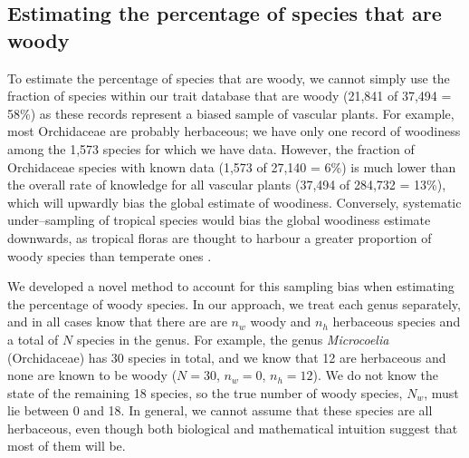 \documentclass[a4paper,12pt]{article}
\begin{document}
\subsection{Estimating the percentage of species that are woody}

To estimate the percentage of species that are woody, we cannot simply
use the fraction of species within our trait database that are woody
(21,841 of 37,494 = 58\%) as these records represent a biased sample
of vascular plants.
For example, most Orchidaceae are probably herbaceous; we have only
one record of woodiness among the 1,573 species for which we have
data.
However, the fraction of Orchidaceae species with known data (1,573 of
27,140 = 6\%)
is much lower than the overall rate of knowledge for all vascular
plants (37,494 of 284,732 = 13\%), which will upwardly bias the global
estimate of woodiness.
Conversely, systematic under--sampling of tropical species would bias
the global woodiness estimate downwards, as tropical floras are thought to harbour
a greater proportion of woody species than temperate ones \citep{Molesheihgt}.


We developed a novel method to account for this sampling bias when
estimating the percentage of woody species.  In our approach, we treat
each genus separately, and in all cases know that there are are $n_w$
woody and $n_h$ herbaceous species and a total of $N$ species in the genus.
%
For example, the genus \textit{Microcoelia} (Orchidaceae) has 30
species in total, and we know that 12 are herbaceous and none are
known to be woody ($N = 30$, $n_w = 0$, $n_h = 12$). We do not know
the state of the remaining 18 species, so the true number of woody
species, $N_w$, must lie between 0 and 18. In general, we cannot
assume that these species are all herbaceous, even though both
biological and mathematical intuition suggest that most of them will
be.
\end{document}
